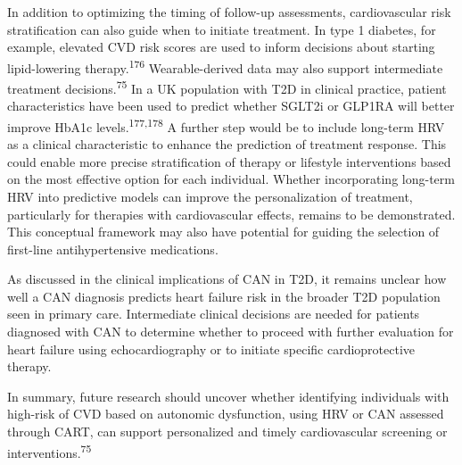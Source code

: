 \documentclass[
  a4paper,
  headsepline=true,
  open=left]{scrbook}
\begin{document}
In addition to optimizing the timing of follow-up assessments,
cardiovascular risk stratification can also guide when to initiate
treatment. In type 1 diabetes, for example, elevated CVD risk scores are
used to inform decisions about starting lipid-lowering
therapy.\textsuperscript{176} Wearable-derived data may also support
intermediate treatment decisions.\textsuperscript{75} In a UK population
with T2D in clinical practice, patient characteristics have been used to
predict whether SGLT2i or GLP1RA will better improve HbA1c
levels.\textsuperscript{177,178} A further step would be to include
long-term HRV as a clinical characteristic to enhance the prediction of
treatment response. This could enable more precise stratification of
therapy or lifestyle interventions based on the most effective option
for each individual. Whether incorporating long-term HRV into predictive
models can improve the personalization of treatment, particularly for
therapies with cardiovascular effects, remains to be demonstrated. This
conceptual framework may also have potential for guiding the selection
of first-line antihypertensive medications.

As discussed in the clinical implications of CAN in T2D, it remains
unclear how well a CAN diagnosis predicts heart failure risk in the
broader T2D population seen in primary care. Intermediate clinical
decisions are needed for patients diagnosed with CAN to determine
whether to proceed with further evaluation for heart failure using
echocardiography or to initiate specific cardioprotective therapy.

In summary, future research should uncover whether identifying
individuals with high-risk of CVD based on autonomic dysfunction, using
HRV or CAN assessed through CART, can support personalized and timely
cardiovascular screening or interventions.\textsuperscript{75}
\end{document}

